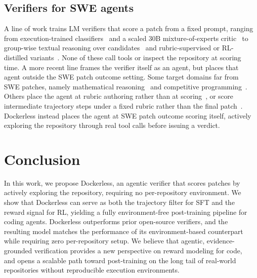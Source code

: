 \documentclass{llmxive}
\providecommand{\approach}{Dockerless\xspace}
\providecommand{\zeng}[1]{\textbf{[Zeng: #1]}}
\begin{document}
\subsection{Verifiers for SWE agents}
A line of work trains LM verifiers that score a patch from a fixed prompt, ranging from execution-trained classifiers~\citep{pan2025training, jain2025r2e} and a scaled 30B mixture-of-experts critic~\citep{shum2025swe} to group-wise textual reasoning over candidates~\citep{xu2025scalable} and rubric-supervised or RL-distilled variants~\citep{wang2026rubric, luo2025deepswe}.
None of these call tools or inspect the repository at scoring time.
A more recent line frames the verifier itself as an agent, but places that agent outside the SWE patch outcome setting.
Some target domains far from SWE patches, namely mathematical reasoning~\citep{zhang2026agentv,zeng2026glimprouter} and competitive programming~\citep{ma2026scaling,hu2026line,Gao0GL25,abs-2510-17130}.
Others place the agent at rubric authoring rather than at scoring~\citep{raghavendra2026agentic}, or score intermediate trajectory steps under a fixed rubric rather than the final patch~\citep{han2026swe}.
\approach instead places the agent at SWE patch outcome scoring itself, actively exploring the repository through real tool calls before issuing a verdict.


\section{Conclusion}

In this work, we propose \approach, an agentic verifier that scores patches by actively exploring the repository, requiring no per-repository environment.
We show that \approach can serve as both the trajectory filter for SFT and the reward signal for RL, yielding a fully environment-free post-training pipeline for coding agents.
\approach outperforms prior open-source verifiers, and the resulting model matches the performance of its environment-based counterpart while requiring zero per-repository setup.
We believe that agentic, evidence-grounded verification provides a new perspective on reward modeling for code, and opens a scalable path toward post-training on the long tail of real-world repositories without reproducible execution environments.
\end{document}
